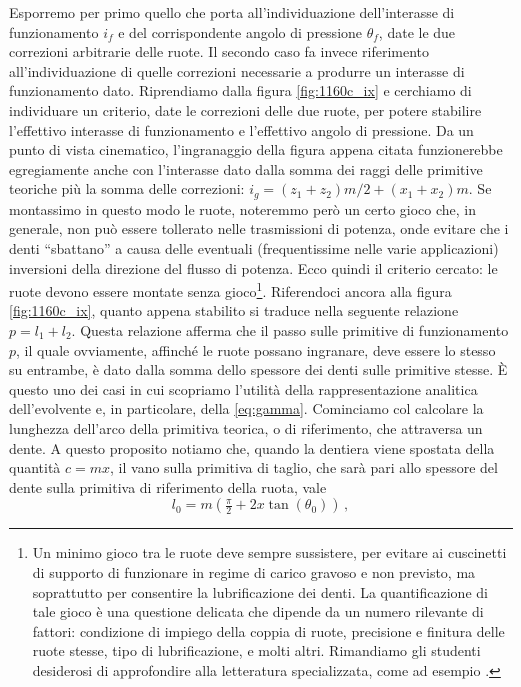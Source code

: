 Esporremo per primo quello che porta 
all'individuazione dell'interasse
di funzionamento $i_f$ e del corrispondente angolo di pressione $\theta_f$,
date le due correzioni arbitrarie delle ruote. 
Il secondo caso fa invece riferimento
all'individuazione di quelle correzioni necessarie a produrre un interasse
di funzionamento dato.
Riprendiamo dalla figura \ref{fig:1160c_ix} e cerchiamo di individuare
un criterio, date le correzioni delle due ruote, per potere stabilire
l'effettivo interasse di funzionamento e l'effettivo angolo di pressione.
Da un punto di vista cinematico, l'ingranaggio della figura appena citata
funzionerebbe egregiamente anche con l'interasse dato dalla somma dei
raggi delle primitive teoriche pi\`u la somma delle correzioni:
$i_g=(z_1 +z_2) m /2 +(x_1+x_2)m$. Se montassimo in questo modo le ruote,
noteremmo per\`o un certo gioco che, in generale, non pu\`o essere tollerato
nelle trasmissioni di potenza, onde evitare che i denti ``sbattano''
 a causa delle eventuali (frequentissime nelle varie
applicazioni) inversioni della direzione del flusso di
potenza. Ecco quindi il criterio cercato: le ruote devono essere montate senza gioco\footnote{
Un minimo gioco tra le ruote deve sempre sussistere, per evitare ai cuscinetti
di supporto di funzionare in regime di carico gravoso e non previsto,
ma soprattutto per consentire la lubrificazione dei denti. La 
quantificazione di tale gioco \`e una questione delicata che dipende da
un numero rilevante di fattori: condizione di impiego della coppia di ruote,
precisione e finitura 
delle ruote stesse, tipo di lubrificazione, e molti altri. Rimandiamo
gli studenti desiderosi di approfondire alla letteratura specializzata, 
come ad esempio \cite{henriot}.
}.
Riferendoci ancora alla figura \ref{fig:1160c_ix}, quanto appena stabilito
si traduce nella seguente relazione $p=l_1 + l_2$. Questa relazione afferma
che il passo sulle primitive di funzionamento $p$, il quale ovviamente,
affinch\'e le ruote possano ingranare, deve essere lo stesso
su entrambe, \`e dato dalla
somma dello spessore dei denti sulle primitive stesse.
\`E questo uno dei casi in cui scopriamo l'utilit\`a della rappresentazione
analitica dell'evolvente e, in particolare, della \ref{eq:gamma}.
Cominciamo col calcolare la lunghezza dell'arco della primitiva teorica, o
di riferimento,
che attraversa un dente. A questo proposito notiamo che, quando la dentiera viene
spostata della quantit\`a $c=mx$, il vano sulla primitiva di taglio, che sar\`a
pari allo spessore del dente sulla primitiva di riferimento della ruota, vale
\begin{equation}
l_0= m \left( \tfrac{\pi}{2} + 2 x \tan(\theta_0) \right)\,,
\label{eq:l0}
\end{equation}
